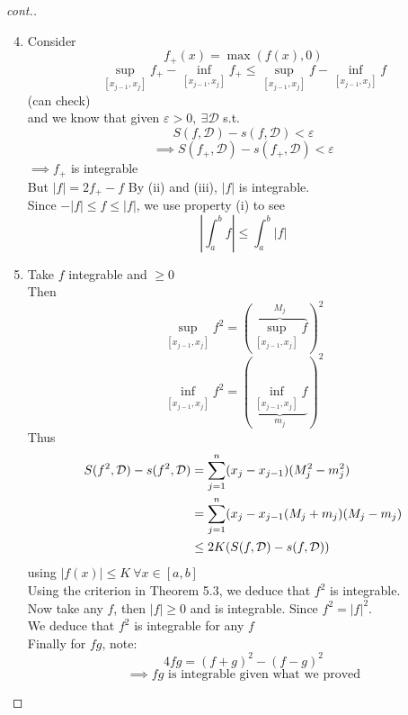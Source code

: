 \begin{claim}[cont.]
\hfill{ }
\begin{proof}[cont.]
\hfill{ }
\begin{enumerate}
\setcounter{enumi}{3}

    

    \item Consider \[f_+(x) = \max(f(x),0)\]
    \[\sup_{[x_{j-1},x_j]} f_+ - \inf_{[x_{j-1},x_j]} f_+ \leq \sup_{[x_{j-1},x_j]} f - \inf_{[x_{j-1},x_j]} f\]
    (can check)\\ and we know that given $\varepsilon > 0, \ \exists \mathcal{D}$ s.t.
    \[S(f,\mathcal{D}) - s(f,\mathcal{D})<\varepsilon\]
    \[\implies S(f_+,\mathcal{D}) - s(f_+,\mathcal{D})<\varepsilon\]
    $\implies f_+$ is integrable\\
    But $|f| = 2f_+ - f$
    By (ii) and (iii), $|f|$ is integrable.\\
    Since $-|f|\leq f\leq |f|$, we use property (i) to see
     \[\left|\int_a^bf\right|\leq \int_a^b|f|\]
     \item Take $f$ integrable and $\geq 0$\\
     Then
     \[\sup_{[x_{j-1},x_j]} f^2 = \left(\overbrace{\sup_{[x_{j-1},x_j]} f}^{M_j}\right)^2\]
     \[\inf_{[x_{j-1},x_j]} f^2 = \left(\underbrace{\inf_{[x_{j-1},x_j]} f}_{m_j}\right)^2\]
     Thus
     \begin{align*}
         S(f^2,\mathcal{D}) - s(f^2,\mathcal{D}) &= \s[j] n (x_j - x_{j-1})(M_j^2 - m_j^2)\\
         &=\s[j] n (x_j - x_{j-1}(M_j + m_j)(M_j - m_j)\\
         &\leq 2K(S(f,\mathcal{D})-s(f,\mathcal{D}))
     \end{align*}
     using $|f(x)|\leq K \ \forall x\in [a,b]$\\
     Using the criterion in Theorem 5.3, we deduce that $f^2$ is integrable.\\
     Now take any $f$, then $|f| \geq 0$ and is integrable. Since $f^2 = |f|^2$.\\
     We deduce that $f^2$ is integrable for any $f$\\
     Finally for $fg$, note:
     \[4fg = (f+g)^2 - (f-g)^2\]
     \[\implies fg\text{ is integrable given what we proved}\]
\end{enumerate}
\end{proof}
\end{claim}
